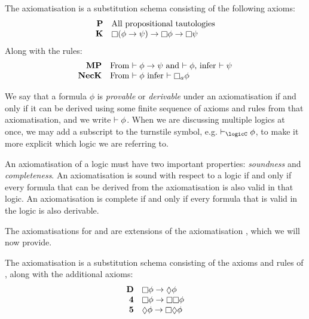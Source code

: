 \begin{definition}
The axiomatisation \axiomK{} is a substitution schema consisting of the
following axioms:
$$
\begin{array}{rl}
{\bf P} & \text{All propositional tautologies}\\
{\bf K} & \knows (\phi \implies \psi) \implies \knows \phi \implies \knows
\psi\\
\end{array}
$$
Along with the rules:
$$
\begin{array}{rl}
{\bf MP} & \text{From $\proves \phi \implies \psi$ and $\proves \phi$, infer
$\proves \psi$}\\
{\bf NecK} & \text{From $\proves \phi$ infer $\proves \knows_a \phi$}\\
\end{array}
$$
\end{definition}

We say that a formula $\phi$ is {\em provable} or {\em derivable} under an
axiomatisation if and only if it can be derived using some finite sequence of
axioms and rules from that axiomatisation, and we write $\vdash \phi$. When we
are discussing multiple logics at once, we may add a subscript to the turnstile
symbol, e.g. $\proves_\logicC \phi$, to make it more explicit which logic we are
referring to.

An axiomatisation of a logic must have two important properties: {\em soundness}
and {\em completeness}. An axiomatisation is sound with respect to a logic if
and only if every formula that can be derived from the axiomatisation is also
valid in that logic. An axiomatisation is complete if and only if every formula
that is valid in the logic is also derivable.

The axiomatisations for \logicKD{} and \logicS{} are extensions of the
axiomatisation \axiomK{}, which we will now provide.

\begin{definition}
The axiomatisation \axiomKD{} is a substitution schema consisting of the axioms
and rules of \axiomK{}, along with the additional axioms:
$$
\begin{array}{rl}
{\bf D} & \knows \phi \implies \suspects \phi\\
{\bf 4} & \knows \phi \implies \knows \knows \phi\\
{\bf 5} & \suspects \phi \implies \knows \suspects \phi\\
\end{array}
$$
\end{definition}

